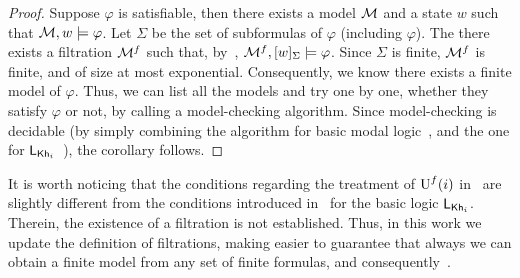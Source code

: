 \begin{proof}
Suppose $\varphi$ is satisfiable, then there exists a model $\mathcal{M}$ and a state $w$ such that $\mathcal{M},w\models\varphi$. Let $\Sigma$ be the set of subformulas of $\varphi$ (including $\varphi$). The there exists a filtration $\mathcal{M}^f$ such that, by~, $\mathcal{M}^f,[w]_\Sigma\models\varphi$. Since $\Sigma$ is finite, $\mathcal{M}^f$ is finite, and of size at most exponential. Consequently, we know there exists a finite model of $\varphi$. Thus, we can list all the models and try one by one, whether they satisfy $\varphi$ or not, by calling a model-checking algorithm. Since model-checking is decidable (by simply combining the algorithm for basic modal logic~\cite{mlbook}, and the one for $\mathsf{L}_{{\sf Kh}_i}$~\cite{AFSVQ21,AFSVQ23report}), the corollary follows. 
\end{proof}

\medskip

It is worth noticing that the conditions regarding the treatment of $\operatorname{U}^f(i)$ in~ are slightly different from the conditions introduced in~\cite{AFSVQ23report} for the basic logic $\mathsf{L}_{{\sf Kh}_i}$. Therein, the existence of a filtration is not established. Thus, in this work we update the definition of filtrations, making easier to guarantee that always we can obtain a finite model from any set of finite formulas, and consequently~.


